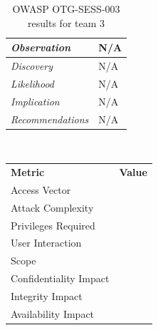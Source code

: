 \documentclass[headsepline,footsepline,footinclude=false,oneside,fontsize=11pt,paper=a4,listof=totoc,bibliography=totoc]{scrbook} %
\begin{document}
 \begin{table}[H]
 	\centering
 	\begin{tabular}{l p{11cm}} 
 		\textit{Observation} &  N/A\\ 
 		\hline
 		\textit{Discovery} &  N/A \\
 		\hline
 		\textit{Likelihood} & N/A\\
 		\hline
 		\textit{Implication} & N/A\\
 		\hline
 		\textit{Recommendations} & N/A\\ 
 	\end{tabular}
 	\caption{OWASP OTG-SESS-003 results for team 3}
 	\label{table:scenario2}
 \end{table}
 \
 \vspace{0.5cm}
 \
 \begin{center}
 	\begin{tabular}{ll}
 		\rowcolor[HTML]{34CDF9} 
 		{\color[HTML]{ECF4FF} \textbf{Metric}}        & {\color[HTML]{ECF4FF} \textbf{Value}} \\
 		\rowcolor[HTML]{BBDAFF} 
 		{\color[HTML]{333333} Access Vector}          & {\color[HTML]{333333} }               \\
 		\rowcolor[HTML]{ECF4FF} 
 		{\color[HTML]{333333} Attack Complexity}      & {\color[HTML]{333333} }               \\
 		\rowcolor[HTML]{BBDAFF} 
 		{\color[HTML]{333333} Privileges Required}    & {\color[HTML]{333333} }               \\
 		\rowcolor[HTML]{ECF4FF} 
 		{\color[HTML]{333333} User Interaction}       & {\color[HTML]{333333} }               \\
 		\rowcolor[HTML]{BBDAFF} 
 		{\color[HTML]{333333} Scope}                  & {\color[HTML]{333333} }               \\
 		\rowcolor[HTML]{ECF4FF} 
 		{\color[HTML]{333333} Confidentiality Impact} & {\color[HTML]{333333} }               \\
 		\rowcolor[HTML]{BBDAFF} 
 		{\color[HTML]{333333} Integrity Impact}       & {\color[HTML]{333333} }               \\
 		\rowcolor[HTML]{ECF4FF} 
 		{\color[HTML]{333333} Availability Impact}    & {\color[HTML]{333333} }              
 	\end{tabular}
 \end{center}
\pagebreak 
\end{document}
